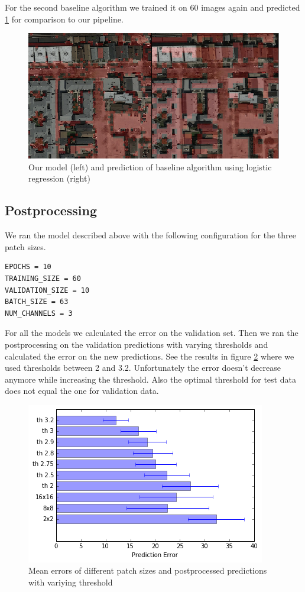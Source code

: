 \documentclass[10pt,conference,compsocconf]{IEEEtran}
\begin{document}
For the second baseline algorithm we trained it on 60 images again and predicted \ref{fig:scikit} for comparison to our pipeline.

\begin{figure}
	\includegraphics[width=\columnwidth]{pictures/baseline1-comp}
	\caption{Our model (left) and prediction of baseline algorithm using logistic regression (right)}
	\label{fig:scikit}
\end{figure}

\subsection{Postprocessing}
We ran the model described above with the following configuration for the three patch sizes. 
\begin{lstlisting}
EPOCHS = 10
TRAINING_SIZE = 60
VALIDATION_SIZE = 10
BATCH_SIZE = 63
NUM_CHANNELS = 3
\end{lstlisting}
For all the models we calculated the error on the validation set. Then we ran the postprocessing on the validation predictions with varying thresholds and calculated the error on the new predictions. See the results in figure \ref{fig:postprocessing} where we used thresholds between 2 and 3.2. Unfortunately the error doesn't decrease anymore while increasing the threshold. Also the optimal threshold for test data does not equal the one for validation data.

\begin{figure}
	\centering
	\includegraphics[width=.8\columnwidth]{pictures/postprocessing}
	\caption{Mean errors of different patch sizes and postprocessed predictions with variying threshold}
	\label{fig:postprocessing}
\end{figure}
\end{document}
